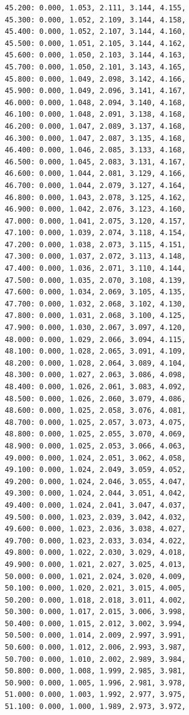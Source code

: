 \documentclass[12pt, a4paper]{article}
\begin{document}
\begin{scriptsize}
\begin{ttfamily}
\begin{lstlisting}
45.200: 0.000, 1.053, 2.111, 3.144, 4.155, 
45.300: 0.000, 1.052, 2.109, 3.144, 4.158, 
45.400: 0.000, 1.052, 2.107, 3.144, 4.160, 
45.500: 0.000, 1.051, 2.105, 3.144, 4.162, 
45.600: 0.000, 1.050, 2.103, 3.144, 4.163, 
45.700: 0.000, 1.050, 2.101, 3.143, 4.165, 
45.800: 0.000, 1.049, 2.098, 3.142, 4.166, 
45.900: 0.000, 1.049, 2.096, 3.141, 4.167, 
46.000: 0.000, 1.048, 2.094, 3.140, 4.168, 
46.100: 0.000, 1.048, 2.091, 3.138, 4.168, 
46.200: 0.000, 1.047, 2.089, 3.137, 4.168, 
46.300: 0.000, 1.047, 2.087, 3.135, 4.168, 
46.400: 0.000, 1.046, 2.085, 3.133, 4.168, 
46.500: 0.000, 1.045, 2.083, 3.131, 4.167, 
46.600: 0.000, 1.044, 2.081, 3.129, 4.166, 
46.700: 0.000, 1.044, 2.079, 3.127, 4.164, 
46.800: 0.000, 1.043, 2.078, 3.125, 4.162, 
46.900: 0.000, 1.042, 2.076, 3.123, 4.160, 
47.000: 0.000, 1.041, 2.075, 3.120, 4.157, 
47.100: 0.000, 1.039, 2.074, 3.118, 4.154, 
47.200: 0.000, 1.038, 2.073, 3.115, 4.151, 
47.300: 0.000, 1.037, 2.072, 3.113, 4.148, 
47.400: 0.000, 1.036, 2.071, 3.110, 4.144, 
47.500: 0.000, 1.035, 2.070, 3.108, 4.139, 
47.600: 0.000, 1.034, 2.069, 3.105, 4.135, 
47.700: 0.000, 1.032, 2.068, 3.102, 4.130, 
47.800: 0.000, 1.031, 2.068, 3.100, 4.125, 
47.900: 0.000, 1.030, 2.067, 3.097, 4.120, 
48.000: 0.000, 1.029, 2.066, 3.094, 4.115, 
48.100: 0.000, 1.028, 2.065, 3.091, 4.109, 
48.200: 0.000, 1.028, 2.064, 3.089, 4.104, 
48.300: 0.000, 1.027, 2.063, 3.086, 4.098, 
48.400: 0.000, 1.026, 2.061, 3.083, 4.092, 
48.500: 0.000, 1.026, 2.060, 3.079, 4.086, 
48.600: 0.000, 1.025, 2.058, 3.076, 4.081, 
48.700: 0.000, 1.025, 2.057, 3.073, 4.075, 
48.800: 0.000, 1.025, 2.055, 3.070, 4.069, 
48.900: 0.000, 1.025, 2.053, 3.066, 4.063, 
49.000: 0.000, 1.024, 2.051, 3.062, 4.058, 
49.100: 0.000, 1.024, 2.049, 3.059, 4.052, 
49.200: 0.000, 1.024, 2.046, 3.055, 4.047, 
49.300: 0.000, 1.024, 2.044, 3.051, 4.042, 
49.400: 0.000, 1.024, 2.041, 3.047, 4.037, 
49.500: 0.000, 1.023, 2.039, 3.042, 4.032, 
49.600: 0.000, 1.023, 2.036, 3.038, 4.027, 
49.700: 0.000, 1.023, 2.033, 3.034, 4.022, 
49.800: 0.000, 1.022, 2.030, 3.029, 4.018, 
49.900: 0.000, 1.021, 2.027, 3.025, 4.013, 
50.000: 0.000, 1.021, 2.024, 3.020, 4.009, 
50.100: 0.000, 1.020, 2.021, 3.015, 4.005, 
50.200: 0.000, 1.018, 2.018, 3.011, 4.002, 
50.300: 0.000, 1.017, 2.015, 3.006, 3.998, 
50.400: 0.000, 1.015, 2.012, 3.002, 3.994, 
50.500: 0.000, 1.014, 2.009, 2.997, 3.991, 
50.600: 0.000, 1.012, 2.006, 2.993, 3.987, 
50.700: 0.000, 1.010, 2.002, 2.989, 3.984, 
50.800: 0.000, 1.008, 1.999, 2.985, 3.981, 
50.900: 0.000, 1.005, 1.996, 2.981, 3.978, 
51.000: 0.000, 1.003, 1.992, 2.977, 3.975, 
51.100: 0.000, 1.000, 1.989, 2.973, 3.972, 

\end{lstlisting}
\end{ttfamily}
\end{scriptsize}
\end{document}
